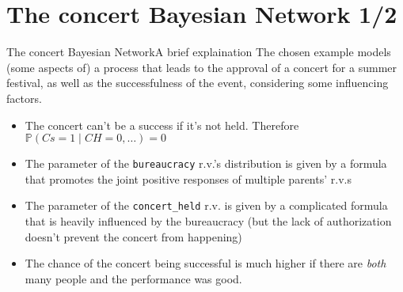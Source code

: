 \documentclass[10pt,xcolor={table,dvipsnames}]{beamer} 		%
\theoremstyle{plain}					%
\theoremstyle{definition}
\theoremstyle{remark}
\begin{document}
\section*{The concert Bayesian Network 1/2}
	\begin{frame}{The concert Bayesian Network}{A brief explaination}
		The chosen example models (some aspects of) a process that 
		leads to the approval of a concert for a summer festival, as 
		well as the successfulness of the event, considering some 
		influencing factors. 
		\smallskip 

		\smallskip 

		\begin{itemize}
			\item<3-> The concert can't be a success if it's not held. Therefore
			$\mathbb{P}\left(Cs=1\mid CH=0,\dots\right)=0$
			\item<4-> The parameter of the \texttt{bureaucracy} r.v.'s distribution is given 
			by a formula that promotes the joint positive responses of multiple parents' r.v.s
			\item<5-> The parameter of the \texttt{concert\_held} r.v. is given by a complicated 
			formula that is heavily influenced by the bureaucracy (but the lack of authorization
			doesn't prevent the concert from happening)
			\item<6-> The chance of the concert being successful is much higher if there are 
			\emph{both} many people and the performance was good.
		\end{itemize}
	\end{frame}
\end{document}
